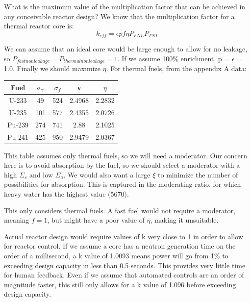 \documentclass{hw}
\begin{document}
	What is the maximum value of the multiplication factor that can be achieved in any conceivable reactor design?
\solution
	We know that the multiplication factor for a thermal reactor core is: \[ k_{eff} = \epsilon p f \eta P_{FNL} P_{TNL} \]

	We can assume that an ideal core would be large enough to allow for no leakage, so $ P_{fast non leakage} = P_{thermal non leakage} = 1 $. If we assume 100\% enrichment, p = $ \epsilon $ = 1.0. Finally we should maximize $ \eta $. For thermal fuels, from the appendix A data:
	\begin{table}[h]
		\begin{tabular}{|c|c|c|c|c|}
			\hline
			Fuel & $\sigma_{\gamma}$ & $\sigma_f$ & v & $\eta$ \\
			\hline
			U-233 & 49 & 524 & 2.4968 & 2.2832 \\
			U-235 & 101 & 577 & 2.4355 & 2.0726 \\
			Pu-239 & 274 & 741 & 2.88 & 2.1025 \\
			Pu-241 & 425 & 950 & 2.9479 & 2.0367 \\
			\hline
		\end{tabular}
	\end{table}
	This table assumes only thermal fuels, so we will need a moderator. Our concern here is to avoid absorption by the fuel, so we should select a moderator with a high $ \Sigma_s $ and low $ \Sigma_a $. We would also want a large $\xi$ to minimize the number of possibilities for absorption. This is captured in the moderating ratio, for which heavy water has the highest value (5670).

	This only considers thermal fuels. A fast fuel would not require a moderator, meaning $f=1$, but might have a poor value of $\eta$, making it unsuitable.

	Actual reactor design would require values of k very close to 1 in order to allow for reactor control. If we assume a core has a neutron generation time on the order of a millisecond, a k value of 1.0093 means power will go from 1\% to exceeding design capacity in less than 0.5 seconds. This provides very little time for human feedback. Even if we assume that automated controls are an order of magnitude faster, this still only allows for a k value of 1.096 before exceeding design capacity.
\end{document}
